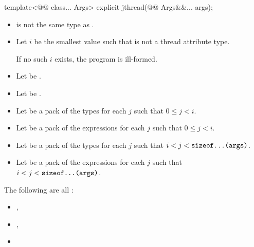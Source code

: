 \documentclass{wg21}
\begin{document}
%
\begin{itemdecl}
template<@@ class... Args>
explicit jthread(@@ Args&&... args);
\end{itemdecl}
\begin{itemdescr}
\constraints
\begin{itemize}
\item {} is not the same type as .
\end{itemize}

\begin{addedblock}
\begin{itemize}[leftmargin=*]
\item Let $i$ be the smallest value such that  is not a thread attribute type.

If no such $i$ exists, the program is ill-formed.

\item Let  be .
\item Let  be .
\item Let  be a pack of the types  for each $j$ such that $ 0 \leq j < i $.
\item Let  be a pack of the expressions  for each $j$ such that $ 0 \leq j < i $.
\item Let  be a pack of the types  for each $j$ such that $ i < j <  \texttt{sizeof...(args)}$.
\item Let  be a pack of the expressions  for each $j$ such that $ i < j < \texttt{sizeof...(args)}$.
\end{itemize}
\end{addedblock}

\pnum
\mandates
The following are all :
\begin{itemize}
\item {},
\item {}, 
\begin{addedblock}
\end{addedblock}
\item {} 
\end{itemize}


\end{itemdescr}
\end{document}
